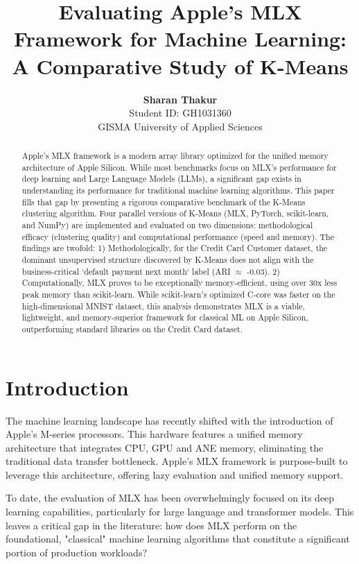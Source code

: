 \documentclass[twocolumn,a4paper]{article}
\title{Evaluating Apple's MLX Framework for Machine Learning: A Comparative Study of K-Means}
\author{\textbf{Sharan Thakur} \\ Student ID: GH1031360 \\ GISMA University of Applied Sciences}
\date{\monthyeardate}
\begin{document}
\maketitle

\begin{abstract}
Apple's MLX framework is a modern array library optimized for the unified memory architecture of Apple Silicon. While most benchmarks focus on MLX's performance for deep learning and Large Language Models (LLMs), a significant gap exists in understanding its performance for traditional machine learning algorithms. This paper fills that gap by presenting a rigorous comparative benchmark of the K-Means clustering algorithm. Four parallel versions of K-Means (MLX, PyTorch, scikit-learn, and NumPy) are implemented and evaluated on two dimensions: methodological efficacy (clustering quality) and computational performance (speed and memory). The findings are twofold: 1) Methodologically, for the Credit Card Customer dataset, the dominant unsupervised structure discovered by K-Means does not align with the business-critical `default payment next month` label (ARI $\approx$ -0.03). 2) Computationally, MLX proves to be exceptionally memory-efficient, using over 30x less peak memory than scikit-learn. While scikit-learn's optimized C-core was faster on the high-dimensional MNIST dataset, this analysis demonstrates MLX is a viable, lightweight, and memory-superior framework for classical ML on Apple Silicon, outperforming standard libraries on the Credit Card dataset.
\end{abstract}



\section{Introduction}
The machine learning landscape has recently shifted with the introduction of Apple's M-series processors. This hardware features a unified memory architecture that integrates CPU, GPU and ANE memory, eliminating the traditional data transfer bottleneck. Apple's MLX framework \citet{mlx} is purpose-built to leverage this architecture, offering lazy evaluation and unified memory support.

To date, the evaluation of MLX has been overwhelmingly focused on its deep learning capabilities, particularly for large language and transformer models. This leaves a critical gap in the literature: how does MLX perform on the foundational, "classical" machine learning algorithms that constitute a significant portion of production workloads?
\end{document}
